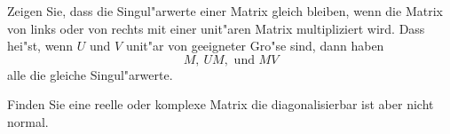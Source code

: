 \documentclass[a4,11pt]{article}
\begin{document}
\begin{aufgabe}[4 Punkte]
Zeigen Sie, dass die Singul"arwerte einer Matrix gleich bleiben, wenn
die Matrix von links oder von rechts mit einer unit"aren Matrix
multipliziert wird. Dass hei"st, wenn $U$ und $V$ unit"ar von
geeigneter Gro"se sind, dann haben
\[
M, \ UM, \text{ und } MV
\]
alle die gleiche Singul"arwerte.
\end{aufgabe}


\begin{aufgabe}[4 Punkte]
Finden Sie eine reelle oder komplexe Matrix die diagonalisierbar ist
aber nicht normal.
\end{aufgabe}


\end{document}
